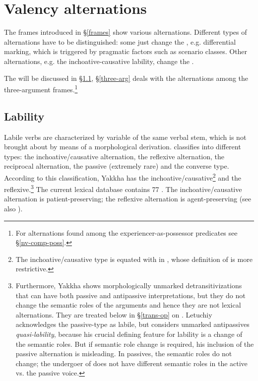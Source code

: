 \section{Valency alternations} \label{valclass}
 
The frames introduced in §\ref{frames} show various alternations.  Different types of alternations have to be distinguished: some just change the , e.g. differential  marking, which is triggered by pragmatic factors such as  scenario classes. Other alternations, e.g. the inchoative-causative lability, change the . 

The   will be discussed  in §\ref{labile},  §\ref{three-arg}  deals with the alternations among the three-argument frames.\footnote{For alternations found among the experiencer-as-possessor predicates see §\ref{nv-comp-poss}.} 


\subsection{Lability}\label{labile}

Labile verbs are characterized by variable  of the same verbal stem, which is not brought about by means of a morphological derivation. \citet[224]{Letuchiy2009Labile} classifies   into different types: the inchoative/causative alternation, the reflexive alternation, the reciprocal alternation, the passive (extremely rare) and the converse type. According to this classification, Yakkha has the inchoative/causative\footnote{The inchoative/causative type is equated with  in \citet{Haspelmath1993More}, whose definition of  is more restrictive.} and the reflexive.\footnote{Furthermore, Yakkha shows morphologically unmarked detransitivizations that can have both passive and antipassive interpretations, but they do not change the semantic roles of the arguments and hence they are not lexical alternations. They are treated below in §\ref{trans-op} on . Letuchiy acknowledges the passive-type as labile, but considers unmarked antipassives \emph{quasi-lability}, because his crucial defining feature for lability is a change of the semantic roles. But if semantic role change is required, his inclusion of the passive alternation is misleading. In passives, the semantic roles do not change; the undergoer of  does not have different semantic roles in the active vs. the passive voice.} The current lexical database contains 77 . The inchoative/causative alternation is patient-preserving; the reflexive alternation is agent-preserving (see also \citealt[223]{Letuchiy2009Labile}). 

